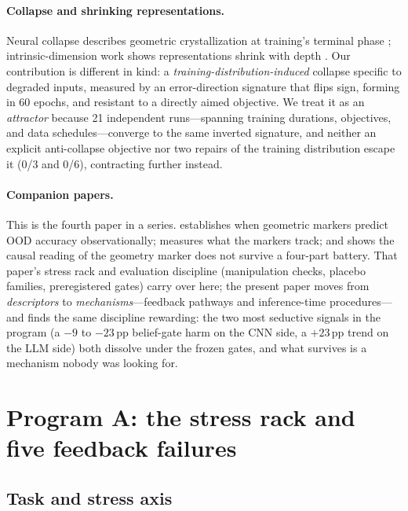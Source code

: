 \documentclass[10pt]{article}
\begin{document}
\paragraph{Collapse and shrinking representations.}
Neural collapse describes geometric crystallization at training's terminal
phase \citep{papyan2020prevalence}; intrinsic-dimension work shows
representations shrink with depth \citep{ansuini2019intrinsic}. Our
contribution is different in kind: a \emph{training-distribution-induced}
collapse specific to degraded inputs, measured by an error-direction
signature that flips sign, forming in 60 epochs, and resistant to a
directly aimed objective. We treat it as an \emph{attractor} because 21
independent runs---spanning training durations, objectives, and data
schedules---converge to the same inverted signature, and neither an
explicit anti-collapse objective nor two repairs of the training
distribution escape it (0/3 and 0/6), contracting further instead.

\paragraph{Companion papers.}
This is the fourth paper in a series. \citet{zhou2026protocol} establishes
when geometric markers predict OOD accuracy observationally;
\citet{zhou2026measuring} measures what the markers track; and
\citet{zhou2026causality} shows the causal reading of the geometry marker
does not survive a four-part battery. That paper's stress rack and
evaluation discipline (manipulation checks, placebo families, preregistered
gates) carry over here; the present paper moves from \emph{descriptors} to
\emph{mechanisms}---feedback pathways and inference-time procedures---and
finds the same discipline rewarding: the two most seductive signals in the
program (a $-9$ to $-23$\,pp belief-gate harm on the CNN side, a
$+23$\,pp trend on the LLM side) both dissolve under the frozen gates, and
what survives is a mechanism nobody was looking for.

\section{Program A: the stress rack and five feedback failures}
\label{sec:stressrack}

\subsection{Task and stress axis}
\label{sec:taskA}
\end{document}
